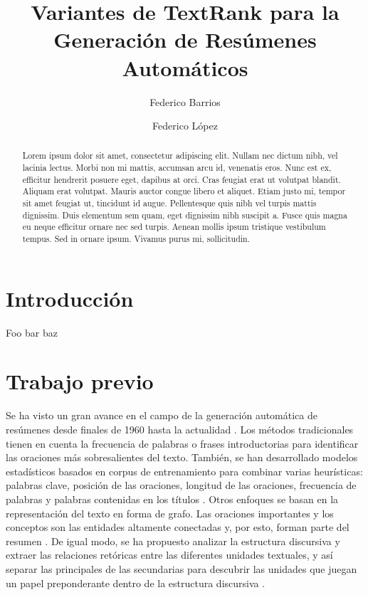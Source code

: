 \documentclass{llncs}
\begin{document}
\frontmatter
\pagestyle{headings}

\title{Variantes de TextRank para la Generación de Resúmenes Automáticos}

\author{Federico Barrios \and Federico López}

\maketitle

\begin{abstract}
Lorem ipsum dolor sit amet, consectetur adipiscing elit. Nullam nec dictum 
nibh, vel lacinia lectus. Morbi non mi mattis, accumsan arcu id, venenatis 
eros. Nunc est ex, efficitur hendrerit posuere eget, dapibus at orci. 
Cras feugiat erat ut volutpat blandit. Aliquam erat volutpat. Mauris 
auctor congue libero et aliquet. Etiam justo mi, tempor sit amet feugiat 
ut, tincidunt id augue. Pellentesque quis nibh vel turpis mattis dignissim. 
Duis elementum sem quam, eget dignissim nibh suscipit a. Fusce quis magna 
eu neque efficitur ornare nec sed turpis. Aenean mollis ipsum tristique vestibulum tempus. 
Sed in ornare ipsum. Vivamus purus mi, sollicitudin.

\end{abstract}

\section{Introducción}
Foo bar baz

\section{Trabajo previo}
Se ha visto un gran avance en el campo de la generación automática de resúmenes desde finales de 1960 hasta la actualidad \cite{miranda}. Los métodos tradicionales tienen en cuenta la frecuencia de palabras o frases introductorias para identificar las oraciones más sobresalientes del texto. También, se han desarrollado modelos estadísticos basados en corpus de entrenamiento para combinar varias heurísticas: palabras clave, posición de las oraciones, longitud de las oraciones, frecuencia de palabras y palabras contenidas en los títulos \cite{hovy}. Otros enfoques se basan en la representación del texto en forma de grafo. Las oraciones importantes y los conceptos son las entidades altamente conectadas y, por esto, forman parte del resumen \cite{barzilay}. De igual modo, se ha propuesto analizar la estructura discursiva y extraer las relaciones retóricas entre las diferentes unidades textuales, y así separar las principales de las secundarias para descubrir las unidades que juegan un papel preponderante dentro de la estructura discursiva \cite{marcu}.
\end{document}
